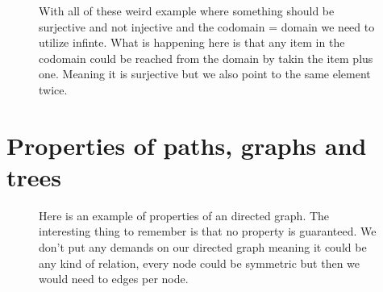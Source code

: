 \documentclass[a5paper]{article}
\begin{document}
\begin{figure}[ht]
	\centering
	\caption*{With all of these weird example where something should be surjective and not injective and the codomain = domain we need to utilize infinte. What is happening here is that any item in the codomain could be reached from the domain by takin the item plus one. Meaning it is surjective but we also point to the same element twice. 
	}\label{fig:2017_1-4-1}
\end{figure}

\section*{Properties of paths, graphs and trees}
\begin{figure}[ht]
	\centering
	\caption*{Here is an example of properties of an directed graph. The interesting thing to remember is that no property is guaranteed.
	 We don't put any demands on our directed graph meaning it could be any kind of relation, every node could be symmetric but then we would need to edges per node. 
	}\label{fig:2017_1-5-1}
\end{figure}
\end{document}
